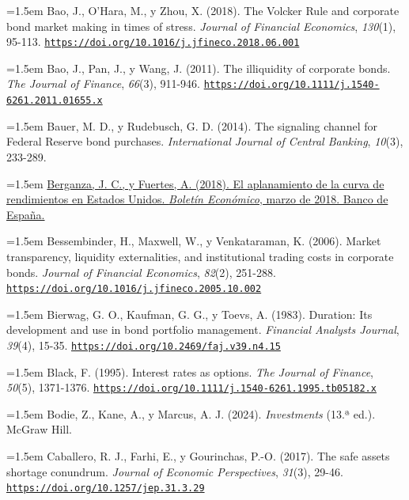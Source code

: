 \documentclass[10pt,a4paper]{article}
\begin{document}
\noindent\hangindent=1.5em Bao, J., O'Hara, M., y Zhou, X. (2018). The Volcker Rule and corporate bond market making in times of stress. \textit{Journal of Financial Economics}, \textit{130}(1), 95-113. \href{https://doi.org/10.1016/j.jfineco.2018.06.001}{\nolinkurl{https://doi.org/10.1016/j.jfineco.2018.06.001}}

\noindent\hangindent=1.5em Bao, J., Pan, J., y Wang, J. (2011). The illiquidity of corporate bonds. \textit{The Journal of Finance}, \textit{66}(3), 911-946. \href{https://doi.org/10.1111/j.1540-6261.2011.01655.x}{\nolinkurl{https://doi.org/10.1111/j.1540-6261.2011.01655.x}}

\noindent\hangindent=1.5em Bauer, M. D., y Rudebusch, G. D. (2014). The signaling channel for Federal Reserve bond purchases. \textit{International Journal of Central Banking}, \textit{10}(3), 233-289.

\noindent\hangindent=1.5em \href{https://ideas.repec.org/a/bde/joures/y2018i3daan6.html}{Berganza, J. C., y Fuertes, A. (2018). El aplanamiento de la curva de rendimientos en Estados Unidos. \textit{Boletín Económico}, marzo de 2018. Banco de España.}

\noindent\hangindent=1.5em Bessembinder, H., Maxwell, W., y Venkataraman, K. (2006). Market transparency, liquidity externalities, and institutional trading costs in corporate bonds. \textit{Journal of Financial Economics}, \textit{82}(2), 251-288. \href{https://doi.org/10.1016/j.jfineco.2005.10.002}{\nolinkurl{https://doi.org/10.1016/j.jfineco.2005.10.002}}

\noindent\hangindent=1.5em Bierwag, G. O., Kaufman, G. G., y Toevs, A. (1983). Duration: Its development and use in bond portfolio management. \textit{Financial Analysts Journal}, \textit{39}(4), 15-35. \href{https://doi.org/10.2469/faj.v39.n4.15}{\nolinkurl{https://doi.org/10.2469/faj.v39.n4.15}}

\noindent\hangindent=1.5em Black, F. (1995). Interest rates as options. \textit{The Journal of Finance}, \textit{50}(5), 1371-1376. \href{https://doi.org/10.1111/j.1540-6261.1995.tb05182.x}{\nolinkurl{https://doi.org/10.1111/j.1540-6261.1995.tb05182.x}}

\noindent\hangindent=1.5em Bodie, Z., Kane, A., y Marcus, A. J. (2024). \textit{Investments} (13.ª ed.). McGraw Hill.

\noindent\hangindent=1.5em Caballero, R. J., Farhi, E., y Gourinchas, P.-O. (2017). The safe assets shortage conundrum. \textit{Journal of Economic Perspectives}, \textit{31}(3), 29-46. \href{https://doi.org/10.1257/jep.31.3.29}{\nolinkurl{https://doi.org/10.1257/jep.31.3.29}}
\end{document}
